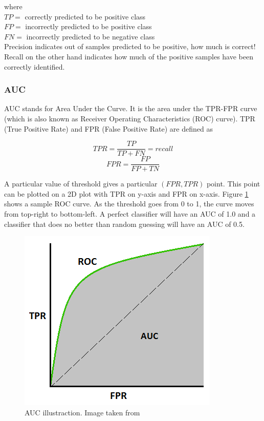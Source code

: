 where \\ 
$TP=$ correctly predicted to be positive class\\ 
$FP=$ incorrectly predicted to be positive class\\
$FN=$ incorrectly predicted to be negative class \\

Precision indicates out of samples predicted to be positive, how much is correct! Recall on the other hand indicates how much of the positive samples have been correctly identified. 

\subsubsection{AUC}
AUC stands for Area Under the Curve. It is the area under the TPR-FPR curve (which is also known as Receiver Operating Characteristics (ROC) curve). TPR (True Positive Rate) and FPR (False Positive Rate) are defined as 

$$ TPR = \frac{TP}{TP + FN} = recall$$
$$ FPR = \frac{FP}{FP + TN}$$

A particular value of threshold gives a particular $(FPR,TPR)$ point. This point can be plotted on a 2D plot with TPR on y-axis and FPR on x-axis. Figure \ref{fig:auc} shows a sample ROC curve. As the threshold goes from 0 to 1, the curve moves from top-right to bottom-left. A perfect classifier will have an AUC of 1.0 and a classifier that does no better than random guessing will have an AUC of 0.5. 


\begin{figure}
    \centering
    \includegraphics[width=0.6\linewidth]{images/auc.PNG}
    \caption[AUC illustraction]{AUC illustraction. Image taken from \cite{auc}}
    \label{fig:auc}
\end{figure}



